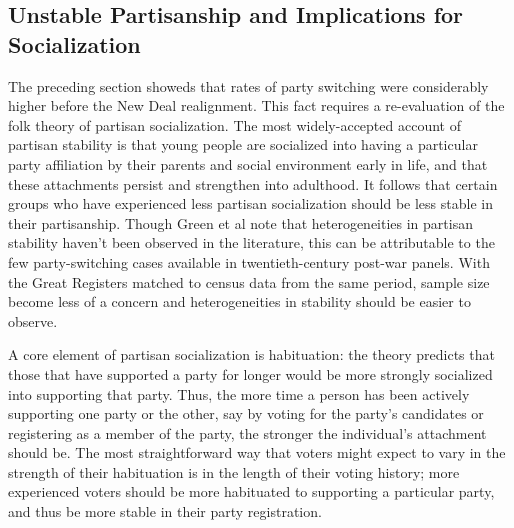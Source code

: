 \documentclass[11pt]{scrartcl}\usepackage[]{graphicx}\usepackage[]{color}
\begin{document}
 


\subsection*{Unstable Partisanship and Implications for Socialization}

The preceding section showeds that rates of party switching were considerably higher before the New Deal realignment. This fact requires a re-evaluation of the folk theory of partisan socialization. The most widely-accepted account of partisan stability is that young people are socialized into having a particular party affiliation by their parents and social environment early in life, and that these attachments persist and strengthen into adulthood.  It follows that certain groups who have experienced less partisan socialization should be less stable in their partisanship.  Though Green et al \citeyearpar{green2004partisan} note that heterogeneities in partisan stability haven't been observed in the literature, this can be attributable to the few party-switching cases available in twentieth-century post-war panels.   With the Great Registers matched to census data from the same period, sample size become less of a concern and heterogeneities in stability should be easier to observe.

A core element of partisan socialization is habituation: the theory predicts that those that have supported a party for longer would be more strongly socialized into supporting that party. Thus, the more time a person has been actively supporting one party or the other, say by voting for the party's candidates or registering as a member of the party, the stronger the individual's attachment should be.  The most straightforward way that voters might expect to vary in the strength of their habituation is in the length of their voting history; more experienced voters should be more habituated to supporting a particular party, and thus be more stable in their party registration.  
\end{document}
